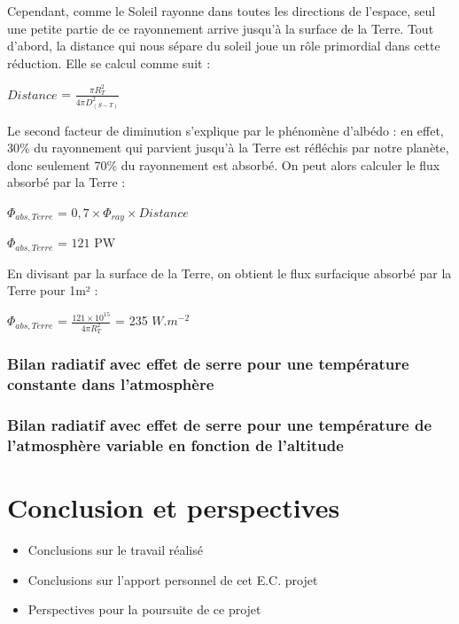 \documentclass[a4paper, 12pt]{report} %
\begin{document}
Cependant, comme le Soleil rayonne dans toutes les directions de l’espace, seul une petite partie de ce rayonnement arrive jusqu’à la surface de la Terre. 
Tout d’abord, la distance qui nous sépare du soleil joue un rôle primordial dans cette réduction. 
\newline Elle se calcul comme suit :
\begin{center}
$Distance$ = $\frac{\pi R_T^{2}}{4 \pi D_{(S-T)}^{2}}$    
\end{center}

Le second facteur de diminution s’explique par le phénomène d’albédo : en effet, 30\% du rayonnement qui parvient jusqu’à la Terre est réfléchis par notre planète, donc seulement 70\% du rayonnement est absorbé. 
\newline On peut alors calculer le flux absorbé par la Terre : 
\begin{center}
$\Phi_{abs,Terre}$ = $0,7 \times \Phi_{ray} \times Distance$    
\end{center}
\begin{center}
$\Phi_{abs,Terre}$ = $121$ PW    
\end{center}

En divisant par la surface de la Terre, 
on obtient le flux surfacique absorbé par la Terre pour 1m² :
\begin{center}
$\Phi_{abs,Terre}$ = $\frac {121 \times 10^{15}}{4 \pi R_T^{2}}$
= 235 $W.m^{-2}$
\end{center}



\subsection{Bilan radiatif avec effet de serre pour une température constante dans l'atmosphère}
\subsection{Bilan radiatif avec effet de serre pour une température de l'atmosphère variable en fonction de l'altitude}

\chapter*{Conclusion et perspectives}
\begin{itemize}
\item Conclusions sur le travail réalisé
\item Conclusions sur l'apport personnel de cet E.C. projet
\item Perspectives pour la poursuite de ce projet
\end{itemize}
\end{document}
